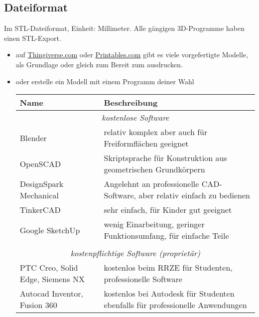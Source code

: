\documentclass{\basedir/fablab-document}
\begin{document}
\subsection{Dateiformat}

Im STL-Dateiformat, Einheit: Millimeter. Alle gängigen 3D-Programme haben einen STL-Export.

\begin{itemize}
    \item auf \href{https://thingiverse.com}{Thingiverse.com} oder  \href{https://printables.com}{Printables.com}  gibt es viele vorgefertigte Modelle, als
        Grundlage oder gleich zum Bereit zum ausdrucken.
    \item oder erstelle ein Modell mit einem Programm deiner Wahl
        \begin{table}[H]
            \centering
            \begin{tabularx}{\textwidth}{|l|X|}
                \hline \textbf{Name} & \textbf{Beschreibung} \\
                \hline \multicolumn{2}{|c|}{\textit{kostenlose Software}}  \\
                \hline Blender & relativ komplex aber auch für Freiformflächen geeignet  \\
                \hline OpenSCAD & Skriptsprache für Konstruktion aus geometrischen Grundkörpern \\
                \hline DesignSpark Mechanical & Angelehnt an professionelle CAD-Software, aber relativ einfach zu bedienen  \\
                \hline TinkerCAD & sehr einfach, für Kinder gut geeignet  \\
                \hline Google SketchUp & wenig Einarbeitung, geringer Funktionsumfang, für einfache Teile \\
                \hline & \\
                \hline \multicolumn{2}{|c|}{\textit{kostenpflichtige Software (proprietär)}}  \\
                \hline PTC Creo, Solid Edge, Siemens NX & kostenlos beim RRZE für Studenten, professionelle Software \\
                \hline Autocad Inventor, Fusion 360 & kostenlos bei Autodesk für Studenten ebenfalls für professionelle Anwendungen \\
                \hline
            \end{tabularx}
        \end{table}
\end{itemize}
\end{document}
